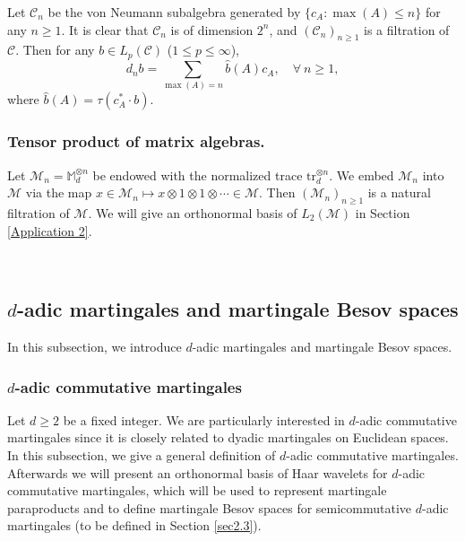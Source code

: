 \documentclass[oneside,english,a4wide]{amsart}
\numberwithin{equation}{section}
\numberwithin{figure}{section}
\theoremstyle{plain}
\theoremstyle{plain}
\theoremstyle{definition}
\theoremstyle{plain}
\theoremstyle{remark}
\theoremstyle{definition}
\theoremstyle{remark}
\theoremstyle{definition}
\newcommand{\8}{\infty}
\begin{document}
Let $\mathcal{C}_n$ be the von Neumann subalgebra generated by $\{c_A: \max(A)\leq n\}$ for any $n\geq 1$. It is clear that $\mathcal{C}_n$ is of dimension $2^n$, and $(\mathcal{C}_n)_{n\geq 1}$ is a filtration of $\mathcal{C}$. Then for any $b\in L_p(\mathcal{C})$ ($1\leq p\leq \8$),
$$  d_nb= \sum_{\max(A)=n}\hat{b}(A)c_A, \quad \forall \ n\geq 1, $$
where $\hat{b}(A)=\tau(c_A^*\cdot b)$.


\subsubsection{\textbf{Tensor product of matrix algebras.}} %
Let $\mathscr{M}_n=\mathbb{M}_d^{\otimes n}$ be endowed with the normalized trace $\text{tr}_d^{\otimes n}$. We embed $\mathscr{M}_n$ into $\mathscr{M}$ via the map $x \in \mathscr{M}_n\longmapsto x\otimes 1\otimes 1\otimes \cdots \in \mathscr{M}$.
Then $(\mathscr{M}_n)_{n\ge 1}$ is a natural filtration of $\mathscr{M}$. We will give an orthonormal basis of $L_2(\mathscr{M})$ in Section \ref{Application 2}.

\

\subsection{$d$-adic martingales and martingale Besov spaces}
In this subsection, we introduce $d$-adic martingales and martingale Besov spaces.
\subsubsection{\textbf{$d$-adic commutative martingales}}

Let $d\ge 2$ be a fixed integer. We are particularly interested in $d$-adic commutative martingales since it is closely related to dyadic martingales on Euclidean spaces. In this subsection, we give a general definition of $d$-adic commutative martingales. Afterwards we will present an orthonormal basis of Haar wavelets for $d$-adic commutative martingales, which will be used to represent martingale paraproducts and to define martingale Besov spaces for semicommutative $d$-adic martingales (to be defined in Section \ref{sec2.3}).
\end{document}
